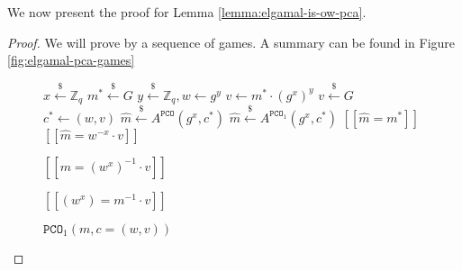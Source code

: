 \documentclass[runningheads]{llncs}
\newcommand{\pco}{\texttt{PCO}}
\newcommand{\leftsample}{\stackrel{\$}{\leftarrow}}
\newcommand{\llbrack}{[\![}
\newcommand{\rrbrack}{]\!]}
\begin{document}
We now present the proof for Lemma \ref{lemma:elgamal-is-ow-pca}. 
\begin{proof}
    We will prove by a sequence of games. A summary can be found in Figure \ref{fig:elgamal-pca-games}

    \begin{figure}[h]
        \centering

        \begin{minipage}[t]{0.4\textwidth}
            \begin{algorithm}[H]
                \caption*{$G_0 - G_2$}
                \begin{algorithmic}[1]
                    \State $x \leftsample \mathbb{Z}_q$
                    \State $m^\ast \leftsample G$
                    \State $y \leftsample \mathbb{Z}_q, w \leftarrow g^y$
                    \State $v \leftarrow m^\ast \cdot (g^x)^y$
                    \State $v \leftsample G$
                    \State $c^\ast \leftarrow (w, v)$
                    \State $\hat{m} \leftsample A^{\pco}(g^x, c^\ast)$
                    \State $\hat{m} \leftsample A^{\pco_1}(g^x, c^\ast)$
                    \State \Return $\llbrack \hat{m} = m^\ast \rrbrack$
                    \State \Return $\llbrack \hat{m} = w^{-x}\cdot v \rrbrack$
                \end{algorithmic}
            \end{algorithm}
        \end{minipage}
        \begin{minipage}[t]{0.4\textwidth}
            \begin{algorithm}[H]
                \caption*{$\pco(m, c=(w, v))$}
                \begin{algorithmic}[1]
                    \State \Return $\llbrack m = (w^x)^{-1}\cdot v\rrbrack$
                \end{algorithmic}
            \end{algorithm}
            \begin{algorithm}[H]
                \caption*{$\pco_1(m, c=(w, v))$}
                \begin{algorithmic}[1]
                    \State \Return $\llbrack (w^x) = m^{-1} \cdot v \rrbrack$
                \end{algorithmic}
            \end{algorithm}
        \end{minipage}


\end{figure}
\end{proof}
\end{document}
